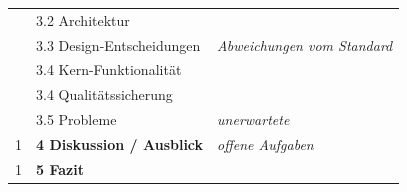 {\begin{tabularx}{\textwidth}{p{}p{}p{}}
        ~      & 3.2 Architektur                           &                                               \\
        ~      & 3.3 Design-Entscheidungen \dotfill        & \textit{Abweichungen vom Standard}            \\
        ~      & 3.4 Kern-Funktionalität                   &                                               \\
        ~      & 3.4 Qualitätssicherung                    &                                               \\
        ~      & 3.5 Probleme \dotfill                     & \textit{unerwartete}                          \\
        1      & \textbf{4 Diskussion / Ausblick} \dotfill & \textit{offene Aufgaben}                      \\
        1      & \textbf{5 Fazit}                          &                                               \\
    \end{tabularx}
}

